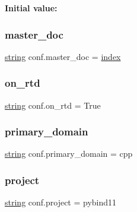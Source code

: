 {\bfseries Initial value\+:}
\begin{DoxyCode}{0}
\DoxyCodeLine{1 =  [}
\DoxyCodeLine{4 ]}

\end{DoxyCode}
\mbox{\label{namespaceconf_a6fcd7e5236f355b1e1a55f9d95988810}} 
\subsubsection{\texorpdfstring{master\_doc}{master\_doc}}
{\footnotesize\ttfamily \mbox{\hyperlink{asdl_8h_ae84541b4f3d8e1ea24ec0f466a8c568b}{string}} conf.\+master\+\_\+doc = \textquotesingle{}\mbox{\hyperlink{_s_d_l__opengl__glext_8h_a57f14e05b1900f16a2da82ade47d0c6d}{index}}\textquotesingle{}}

\mbox{\label{namespaceconf_ac9f32ab656bf05ad872fd46e03504cc8}} 
\subsubsection{\texorpdfstring{on\_rtd}{on\_rtd}}
{\footnotesize\ttfamily \mbox{\hyperlink{asdl_8h_ae84541b4f3d8e1ea24ec0f466a8c568b}{string}} conf.\+on\+\_\+rtd = \textquotesingle{}True\textquotesingle{}}

\mbox{\label{namespaceconf_a7f24fa2b2e1f3905d88d035c328cc9f7}} 
\subsubsection{\texorpdfstring{primary\_domain}{primary\_domain}}
{\footnotesize\ttfamily \mbox{\hyperlink{asdl_8h_ae84541b4f3d8e1ea24ec0f466a8c568b}{string}} conf.\+primary\+\_\+domain = \textquotesingle{}cpp\textquotesingle{}}

\mbox{\label{namespaceconf_a45653c983098153b78e33600e39230eb}} 
\subsubsection{\texorpdfstring{project}{project}}
{\footnotesize\ttfamily \mbox{\hyperlink{asdl_8h_ae84541b4f3d8e1ea24ec0f466a8c568b}{string}} conf.\+project = \textquotesingle{}pybind11\textquotesingle{}}

